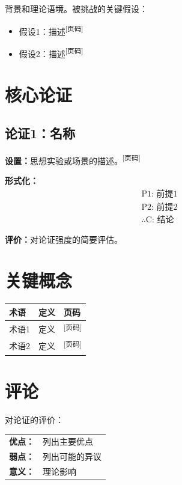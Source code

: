 \documentclass[10pt, a4paper]{article}
\newcommand{\pagemark}[1]{\textsuperscript{\scriptsize[#1]}}
\begin{document}
背景和理论语境。被挑战的关键假设：
\begin{itemize}
  \item 假设1：描述\pagemark{页码}
  \item 假设2：描述\pagemark{页码}
\end{itemize}

\section*{核心论证}

\subsection*{论证1：名称}

\textbf{设置：}思想实验或场景的描述。\pagemark{页码}

\textbf{形式化：}
\begin{align*}
  &\text{P1: 前提1} \\
  &\text{P2: 前提2} \\
  &\therefore \text{C: 结论}
\end{align*}

\textbf{评价：}对论证强度的简要评估。

\section*{关键概念}

\begin{center}
\begin{tabular}{@{}lll@{}}
\toprule
\textbf{术语} & \textbf{定义} & \textbf{页码} \\
\midrule
术语1 & 定义 & \pagemark{页码} \\
术语2 & 定义 & \pagemark{页码} \\
\bottomrule
\end{tabular}
\end{center}

\section*{评论}

对论证的评价：\\[0.3em]
\begin{tabular}{@{}p{3.5cm}p{10cm}@{}}
\textbf{优点：} & 列出主要优点 \\[0.2em]
\textbf{弱点：} & 列出可能的异议 \\[0.2em]
\textbf{意义：} & 理论影响
\end{tabular}
\end{document}
